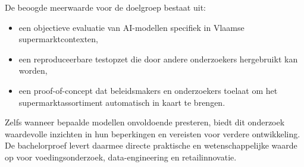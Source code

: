 De beoogde meerwaarde voor de doelgroep bestaat uit:
\begin{itemize}
    \item een objectieve evaluatie van AI-modellen specifiek in Vlaamse supermarktcontexten,
    \item een reproduceerbare testopzet die door andere onderzoekers hergebruikt kan worden,
    \item een proof-of-concept dat beleidsmakers en onderzoekers toelaat om het supermarktassortiment automatisch in kaart te brengen.
\end{itemize}

Zelfs wanneer bepaalde modellen onvoldoende presteren, biedt dit onderzoek waardevolle inzichten in hun beperkingen en vereisten voor verdere ontwikkeling. De bachelorproef levert daarmee directe praktische en wetenschappelijke waarde op voor voedingsonderzoek, data-engineering en retailinnovatie.


